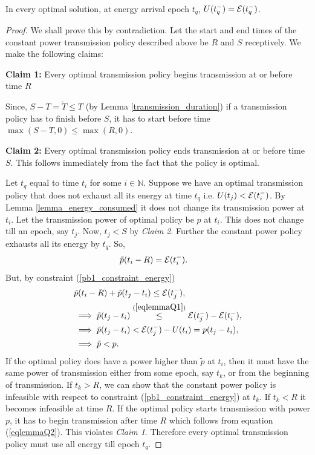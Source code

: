 \begin{lemma}
In every optimal solution, at energy arrival epoch $t_q$, $U(t_q^-)=\mathcal{E}(t_q^-)$.
\label{lemma_Q}
\end{lemma}
\begin{proof}
We shall prove this by contradiction. Let the start and end times of the constant power transmission policy described above be $R$ and $S$ receptively. We make the following claims:

\textbf{Claim 1:} Every optimal transmission policy begins transmission at or before time $R$

Since, $S-T=\widetilde{T}\le T$ (by Lemma \ref{transmission_duration}) if a transmission policy has to finish before $S$, it has to start before time $\max(S-T,0) \le \max(R,0)$. 


\textbf{Claim 2:} Every optimal transmission policy ends transmission at or before time $S$.
This follows immediately from the fact that the policy is optimal.

Let $t_q$ equal to time $t_i$ for some $i\in\mathbb{N}$. Suppose we have an optimal transmission policy that does not exhaust all its energy at time $t_q$ i.e. $U(t_j)<\mathcal{E}(t_i^-)$. By Lemma \ref{lemma_energy_consumed} it does not change its transmission power at $t_i$. Let the transmission power of optimal policy be $p$ at $t_i$. This does not change till an epoch, say $t_j$. Now, $t_j<S$ by \textit{Claim 2}. Further the constant power policy exhausts all its energy by $t_q$. So,
\begin{align}
&\tilde{p}(t_i-R)=\ETx(t_i^-)\label{eqlemmaQ1}.
\end{align}
But, by constraint (\ref{pb1_constraint_energy})
\begin{align}
&\tilde{p}(t_i-R)+\tilde{p}(t_j-t_i)\le \ETx(t_j^-),
\\
&\implies \tilde{p}(t_j-t_i)\stackrel{(\ref{eqlemmaQ1})}{\le} \ETx(t_j^-)-\ETx(t_i^-),\\
&\implies \tilde{p}(t_j-t_i)< \ETx(t_j^-)-U(t_i)=p(t_j-t_i),\\
&\implies \tilde{p}<p .\label{eqlemmaQ2}
\end{align}
If the optimal policy does have a power higher than $\tilde{p}$ at $t_i$, then it must have the same power of transmission either from some epoch, say $t_k$, or from the beginning of transmission. If $t_k>R$, we can show that the constant power policy is infeasible with respect to constraint (\ref{pb1_constraint_energy}) at $t_k$. If $t_k<R$ it becomes infeasible at time $R$. If the optimal policy starts transmission with power $p$, it has to begin transmission after time $R$ which follows from equation (\ref{eqlemmaQ2}). This violates \textit{Claim 1}. Therefore every optimal transmission policy must use all energy till epoch $t_q$.
\end{proof}

